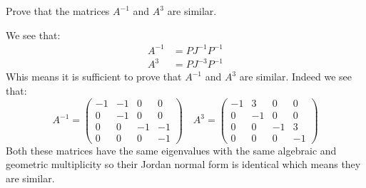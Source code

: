 \documentclass[11pt, a4paper]{article}
\begin{document}
\begin{exercise}
  Prove that the matrices $A^{-1}$ and $A^3$ are similar.
\end{exercise}
\begin{solution}
  We see that:
  \begin{align*}
    A^{-1} &= PJ^{-1}P^{-1} \\
    A^{3}  &= PJ^{-3}P^{-1}
  \end{align*}
  Whis means it is sufficient to prove that $A^{-1}$ and $A^3$ are similar.
  Indeed we see that:
  \[
    A^{-1} = \left(\begin{matrix}
    -1 & -1 & 0 & 0 \\
    0 & -1 & 0 & 0 \\
    0 & 0 & -1 & -1 \\
    0 & 0 & 0 & -1
    \end{matrix}\right) \quad
    A^{3} = \left(\begin{matrix}
    -1 & 3 & 0 & 0 \\
    0 & -1 & 0 & 0 \\
    0 & 0 & -1 & 3 \\
    0 & 0 & 0 & -1
    \end{matrix}\right)
  \]
  Both these matrices have the same eigenvalues with the same algebraic
  and geometric multiplicity so their Jordan normal form is identical
  which means they are similar.
\end{solution}
\end{document}
